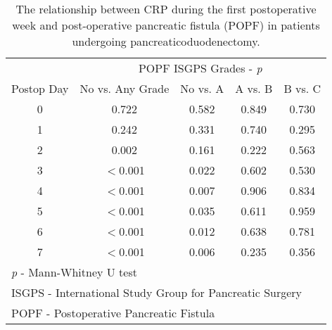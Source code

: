\begin{table}[h]
	\centering
	\caption{The relationship between CRP during the first postoperative week and post-operative pancreatic fistula (POPF) in patients undergoing pancreaticoduodenectomy.}
	\label{table:crp_comp_vs_POPF_ISGPS_p_values_only}
	\renewcommand{\arraystretch}{1.2} %
	\begin{tabular}{| c | c c c c |}
		\hline
		           &       \multicolumn{4}{c}{POPF ISGPS Grades - \textit{p}}        \\
		Postop Day & No vs. Any Grade & No vs. A & A vs. B & B vs. C                 \\ \hline
		0          & 0.722            & 0.582    & 0.849   & 0.730                   \\
		1          & 0.242            & 0.331    & 0.740   & 0.295                   \\
		2          & 0.002            & 0.161    & 0.222   & 0.563                   \\
		3          & $<$0.001         & 0.022    & 0.602   & 0.530                   \\
		4          & $<$0.001         & 0.007    & 0.906   & 0.834                   \\
		5          & $<$0.001         & 0.035    & 0.611   & 0.959                   \\
		6          & $<$0.001         & 0.012    & 0.638   & 0.781                   \\
		7          & $<$0.001         & 0.006    & 0.235   & 0.356                   \\ \hline
		\multicolumn{5}{l}{\textit{p} - Mann-Whitney U test}                         \\
		\multicolumn{5}{l}{ISGPS - International Study Group for Pancreatic Surgery}	\\
				\multicolumn{5}{l}{POPF - Postoperative Pancreatic Fistula}
	\end{tabular}
	
	
\end{table}